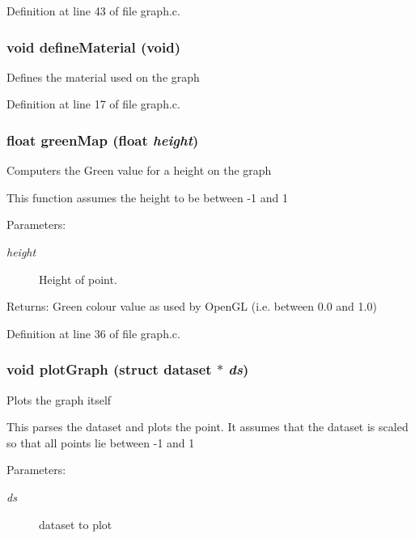 Definition at line 43 of file graph.c.
\subsubsection{\setlength{\rightskip}{0pt plus 5cm}void define\-Material (void)}\label{graph_8h_a0}


Defines the material used on the graph 

Definition at line 17 of file graph.c.
\subsubsection{\setlength{\rightskip}{0pt plus 5cm}float green\-Map (float {\em height})}\label{graph_8h_a2}


Computers the Green value for a height on the graph

This function assumes the height to be between -1 and 1 \begin{Desc}
\item[Parameters:]
\begin{description}
\item[{\em height}]Height of point. \end{description}
\end{Desc}
\begin{Desc}
\item[Returns:]Green colour value as used by Open\-GL (i.e. between 0.0 and 1.0) \end{Desc}


Definition at line 36 of file graph.c.
\subsubsection{\setlength{\rightskip}{0pt plus 5cm}void plot\-Graph (struct {\bf dataset} $\ast$ {\em ds})}\label{graph_8h_a4}


Plots the graph itself

This parses the dataset and plots the point. It assumes that the dataset is scaled so that all points lie between -1 and 1

\begin{Desc}
\item[Parameters:]
\begin{description}
\item[{\em ds}]dataset to plot \end{description}
\end{Desc}


